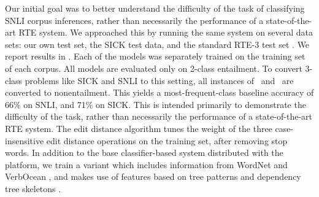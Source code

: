 Our initial goal was to better understand the difficulty of the task of classifying SNLI corpus inferences, rather than necessarily the performance of a state-of-the-art RTE system.
We approached this by running the same system on several data sets:
our own test set,
the SICK test data, and the standard RTE-3 test set \cite{giampiccolo2007third}.
We report results in .
Each of the models was separately trained on the training set of each corpus.
All models are evaluated only on 2-class entailment.
To convert 3-class problems like SICK and SNLI to this setting, all instances
  of \contradiction\ and \unknown\ are converted to nonentailment.
This yields a most-frequent-class baseline accuracy of 66\% on SNLI, and 71\% on SICK\@.
This is intended primarily to demonstrate the difficulty of the task, rather than necessarily
  the performance of a state-of-the-art RTE system.
The edit distance algorithm tunes the weight of the three 
  case-insensitive edit distance operations on the training set, 
  after removing stop words.
In addition to the base classifier-based system distributed with the platform, we
  train a variant which includes information from
  WordNet \cite{miller1995wordnet} and VerbOcean
  \cite{chklovski2004verbocean}, and makes use of features
  based on tree patterns and dependency tree skeletons
  \cite{wang2007recognizing}.

  


